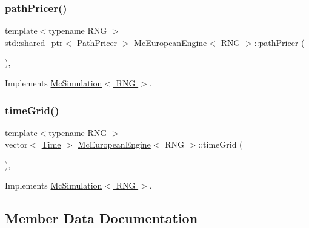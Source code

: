\hypertarget{class_mc_european_engine_aa504b56142c757d49cc4c9e079682f6d}{}\label{class_mc_european_engine_aa504b56142c757d49cc4c9e079682f6d} 
\subsubsection{\texorpdfstring{path\+Pricer()}{pathPricer()}}
{\footnotesize\ttfamily template$<$typename R\+NG $>$ \\
std\+::shared\+\_\+ptr$<$ \hyperlink{class_path_pricer}{Path\+Pricer} $>$ \hyperlink{class_mc_european_engine}{Mc\+European\+Engine}$<$ R\+NG $>$\+::path\+Pricer (\begin{DoxyParamCaption}{ }\end{DoxyParamCaption})\hspace{0.3cm}{\ttfamily [override]}, {\ttfamily [virtual]}}



Implements \hyperlink{class_mc_simulation_ae3b894a78823df7897abf418bb04a4a1}{Mc\+Simulation$<$ R\+N\+G $>$}.

\hypertarget{class_mc_european_engine_a0c81d3320dc3567596b41d91444f5f54}{}\label{class_mc_european_engine_a0c81d3320dc3567596b41d91444f5f54} 
\subsubsection{\texorpdfstring{time\+Grid()}{timeGrid()}}
{\footnotesize\ttfamily template$<$typename R\+NG $>$ \\
vector$<$ \hyperlink{_name_def_8h_ac2d3e0ba793497bcca555c7c2cf64ff3}{Time} $>$ \hyperlink{class_mc_european_engine}{Mc\+European\+Engine}$<$ R\+NG $>$\+::time\+Grid (\begin{DoxyParamCaption}{ }\end{DoxyParamCaption})\hspace{0.3cm}{\ttfamily [override]}, {\ttfamily [virtual]}}



Implements \hyperlink{class_mc_simulation_ac3c90184d3d97fc7c01c974ad861f8d9}{Mc\+Simulation$<$ R\+N\+G $>$}.



\subsection{Member Data Documentation}
\hypertarget{class_mc_european_engine_a4f951d1b93039bb0cf5e65abb1d61f2e}{}\label{class_mc_european_engine_a4f951d1b93039bb0cf5e65abb1d61f2e} 

